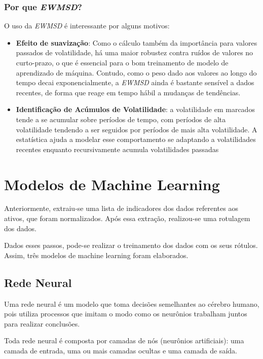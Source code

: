 \documentclass{article}
\begin{document}
\subsubsection{Por que \textit{EWMSD}?}

\cite{Knight} O uso da \textit{EWMSD} é interessante por alguns motivos:

\begin{itemize}
    \item \textbf{Efeito de suavização}: Como o cálculo também da importância para valores passados de volatilidade, há uma maior robustez contra ruídos de valores no curto-prazo, o que é essencial para o bom treinamento de modelo de aprendizado de máquina. Contudo, como o peso dado aos valores ao longo do tempo decai exponencialmente, a \textit{EWMSD} ainda é bastante sensível a dados recentes, de forma que  reage em tempo hábil a mudanças de tendências.
    
    \item \textbf{Identificação de Acúmulos de Volatilidade}: a volatilidade em marcados tende a se acumular sobre períodos de tempo, com períodos de alta volatilidade tendendo a ser seguidos por períodos de mais alta volatilidade. A estatística ajuda a modelar esse comportamento se adaptando a volatilidades recentes enquanto recursivamente acumula volatilidades passadas
\end{itemize}

\newpage

\section{Modelos de Machine Learning}

Anteriormente, extraiu-se uma lista de indicadores dos dados referentes aos ativos, que foram normalizados. Após essa extração, realizou-se uma rotulagem dos dados. 

Dados esses passos, pode-se realizar o treinamento dos dados com os seus rótulos. Assim, três modelos de machine learning foram elaborados.

\subsection{Rede Neural}

Uma rede neural é um modelo que toma decisões semelhantes ao cérebro humano, pois utiliza processos que imitam o modo como os neurônios trabalham juntos para realizar conclusões.

Toda rede neural é composta por camadas de nós (neurônios artificiais): uma camada de entrada, uma ou mais camadas ocultas e uma camada de saída.
\end{document}
